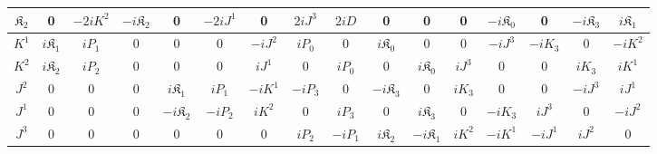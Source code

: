 \documentclass[foundations,article,submit,pdftex,moreauthors]{Definitions/mdpi}
\begin{document}
\begin{minipage}[t]{\textwidth}
{\begin{tabular}{ |c||c|c|c|c|c|c|c|c|c|c|c|c|c|c|c| }
 \hline 
 \rule{0pt}{16pt} $\mathfrak{K}_{{2}}$ &0&$-2i{K}^{{2}}$&$-i\mathfrak{K}_{{2}}$&0&${-2i{J}^{{1}}}$&0&$2iJ^{{3}}$&$2iD$&0&0&0&$-i\mathfrak{K}_{{0}}$&0&${-i\mathfrak{K}_{{3}}}$&$i\mathfrak{K}_{{1}}$\\
 \hline 
 \rule{0pt}{16pt} ${K}^{{1}}$ &$i\mathfrak{K}_{{1}}$&$iP_{{1}}$&0&0&0&$-i{J}^{{2}}$&$iP_{{0}}$&0&$i\mathfrak{K}_{{0}}$&0&0&$-iJ^{{3}}$&${-iK_{{3}}}$&0&$-i{K}^{{2}}$\\
 \hline 
 \rule{0pt}{16pt} ${K}^{{2}}$ &$i\mathfrak{K}_{{2}}$&$iP_{{2}}$&0&0&0&$i{J}^{{1}}$&0&$iP_{{0}}$&0&$i\mathfrak{K}_{{0}}$&$iJ^{{3}}$&0&0&${iK_{{3}}}$&$i{K}^{{1}}$\\
 \hline 
 \rule{0pt}{16pt} ${J}^{{2}}$ &0&0&0&${i\mathfrak{K}_{{1}}}$&${iP_{{1}}}$&$-i{K}^{{1}}$&$-iP_{{3}}$&0&${-i\mathfrak{K}_{{3}}}$&0&$iK_{{3}}$&0&0&$-iJ^{{3}}$&$i{J}^{{1}}$\\
 \hline 
 \rule{0pt}{16pt} ${J}^{{1}}$ &0&0&0&${-i\mathfrak{K}_{{2}}}$&${-iP_{{2}}}$&$i{K}^{{2}}$&0&$iP_{{3}}$&0&${i\mathfrak{K}_{{3}}}$&0&$-iK_{{3}}$&$iJ^{{3}}$&0&$-i{J}^{{2}}$\\
 \hline 
 \rule{0pt}{16pt} $J^{{3}}$ &0&0&0&0&0&0&$iP_{{2}}$&$-iP_{{1}}$&$i\mathfrak{K}_{{2}}$&$-i\mathfrak{K}_{{1}}$&$i{K}^{{2}}$&$-i{K}^{{1}}$&$-i{J}^{{1}}$&$i{J}^{{2}}$&0\\
 \hline 
\end{tabular}} 
\label{tableIFD}
\end{minipage}
\endgroup



\end{document}
